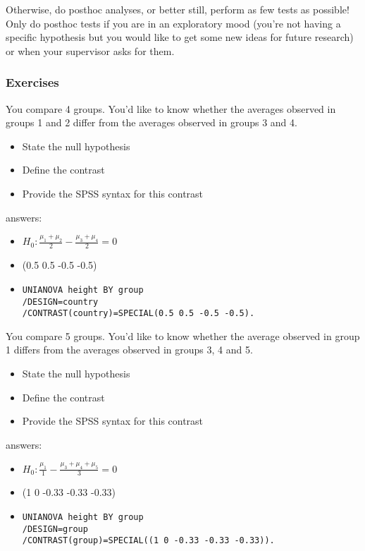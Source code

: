 Otherwise, do posthoc analyses, or better still, perform as few tests as possible! Only do posthoc tests if you are in an exploratory mood (you're not having a specific hypothesis but you would like to get some new ideas for future research) or when your supervisor asks for them.





\subsubsection{Exercises}

You compare 4 groups. You'd like to know whether the averages observed in groups 1 and 2 differ from the averages observed in groups 3 and 4. 

\begin{itemize}
\item State the null hypothesis
\item Define the contrast
\item Provide the SPSS syntax for this contrast
\end{itemize}

answers: 
\begin{itemize}
\item $H_0: \frac{\mu_1 + \mu_2}{2} - \frac{\mu_3 + \mu_4}{2} = 0  $
\item (0.5 0.5 -0.5 -0.5)
\item \begin{verbatim}
UNIANOVA height BY group
/DESIGN=country
/CONTRAST(country)=SPECIAL(0.5 0.5 -0.5 -0.5).
\end{verbatim}
\end{itemize}




You compare 5 groups. You'd like to know whether the average observed in group 1 differs from the averages observed in groups 3, 4 and 5. 

\begin{itemize}
\item State the null hypothesis
\item Define the contrast
\item Provide the SPSS syntax for this contrast
\end{itemize}

answers: 
\begin{itemize}
\item $H_0: \frac{\mu_1}{1} - \frac{\mu_3 + \mu_4 + \mu_5}{3} = 0  $
\item (1 0 -0.33 -0.33 -0.33)
\item \begin{verbatim}
UNIANOVA height BY group
/DESIGN=group
/CONTRAST(group)=SPECIAL((1 0 -0.33 -0.33 -0.33)).
\end{verbatim}
\end{itemize}



